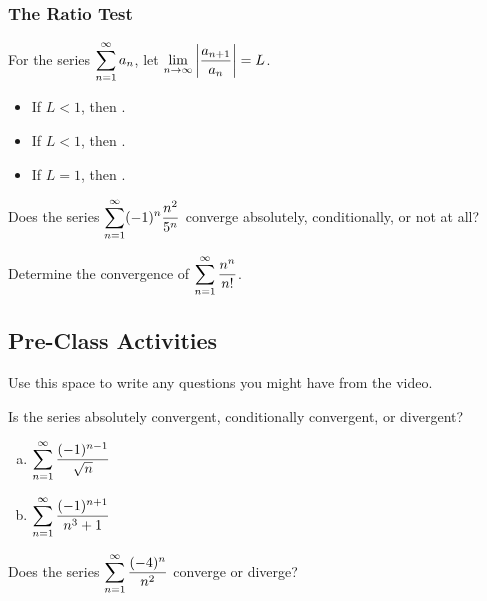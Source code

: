 \documentclass[notes]{subfiles}
\begin{document}
	\subsubsection*{The Ratio Test}
		\begin{rmk}
			For the series $\displaystyle \sum_{n=1}^\infty a_n$, let $\displaystyle \lim_{n\to\infty} \left|\dfrac{a_{n+1}}{a_n}\right| = L$.\\[20pt]
			\begin{itemize}
				\setlength\itemsep{15pt}
				
				\item If $L < 1$, then .
				\item If $L < 1$, then .
				\item If $L = 1$, then .
			\end{itemize}
		\end{rmk}
			\newpage
			
		\begin{ex}
			Does the series $\displaystyle \sum_{n=1}^\infty (-1)^n \dfrac{n^2}{5^n}$ converge absolutely, conditionally, or not at all?
		\end{ex}
			
		\begin{ex}
			Determine the convergence of $\displaystyle \sum_{n=1}^\infty \dfrac{n^n}{n!}$.
		\end{ex}
			\newpage
			
	\subsection*{Pre-Class Activities}
		\begin{ex}
			Use this space to write any questions you might have from the video.
		\end{ex}
			
		\begin{ex}
			Is the series absolutely convergent, conditionally convergent, or divergent?
			\begin{enumerate}[(a)]
				\item $\displaystyle \sum_{n=1}^\infty \dfrac{(-1)^{n-1}}{\sqrt{n}}$
					
				\item $\displaystyle \sum_{n=1}^\infty \dfrac{(-1)^{n+1}}{n^3+1}$
			\end{enumerate}
		\end{ex}
		
		\begin{ex}
			Does the series $\displaystyle \sum_{n=1}^\infty \dfrac{(-4)^n}{n^2}$ converge or diverge?
		\end{ex}
			
\end{document}
